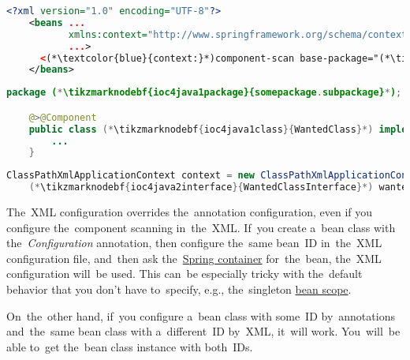 \begin{lstlisting}[language=XML, title={Configuration XML}]
    <?xml version="1.0" encoding="UTF-8"?>
    <beans ...
           xmlns:context="http://www.springframework.org/schema/context"
           ...>
      <(*\textcolor{blue}{context:}*)component-scan base-package="(*\tikzmarknodebf{ioc4xml1package}{somepackage.subpackage}[ForestGreen]*)"/>
    </beans>
\end{lstlisting}
\begin{lstlisting}[language=Java, title={Wanted class}]
    package (*\tikzmarknodebf{ioc4java1package}{somepackage.subpackage}*);

    @>@Component
    public class (*\tikzmarknodebf{ioc4java1class}{WantedClass}*) implements (*\tikzmarknodebf{ioc4java1interface}{WantedClassInterface}*) {
        ...
    }
\end{lstlisting}
\begin{lstlisting}[language=Java, title={Usage}]
    ClassPathXmlApplicationContext context = new ClassPathXmlApplicationContext("configurationFile.xml");
    (*\tikzmarknodebf{ioc4java2interface}{WantedClassInterface}*) wantedClassInstance = context.getBean("(*\tikzmarknodebf{ioc4java2beanid}{wantedClass}[ForestGreen]*)", (*\tikzmarknodebf{ioc4java2interface2}{WantedClassInterface}*).class);
\end{lstlisting}

\warningnonl The~XML configuration overrides the~annotation configuration, even if you configure the~component scanning in~the~XML. If~you create a~bean class with the~\textit{Configuration} annotation, then configure the~same bean~ID in~the~XML configuration file, and~then ask the~\hyperref[springcontainrer]{Spring container} for~the~bean, the~XML configuration will~be used. This can~be especially tricky with the~default behavior that you don't have to~specify, e.g., the~singleton \hyperref[beanscope]{bean scope}.

On~the~other hand, if~you configure a~bean class with some~ID by~annotations and~the~same bean class with a~different~ID by~XML, it~will work. You~will~be able to~get the~bean class instance with both~IDs.

